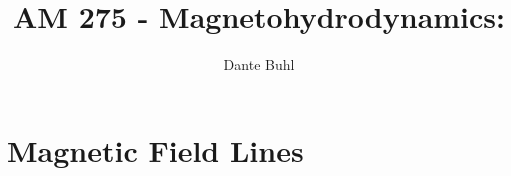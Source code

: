 \documentclass{article}
\begin{document}
\title{AM 275 - Magnetohydrodynamics:}
\author{Dante Buhl}


\newcommand{\wrms}{w_{\text{rms}}}
\newcommand{\bs}[1]{\boldsymbol{#1}}
\newcommand{\tb}[1]{\textbf{#1}}
\newcommand{\bmp}[1]{\begin{minipage}{#1\textwidth}}
\newcommand{\emp}{\end{minipage}}
\newcommand{\R}{\mathbb{R}}
\newcommand{\C}{\mathbb{C}}
\newcommand{\N}{\mathcal{N}}
\newcommand{\K}{\bs{\mathrm{K}}}
\newcommand{\m}{\bs{\mu}_*}
\newcommand{\s}{\bs{\Sigma}_*}
\newcommand{\dt}{\Delta t}
\newcommand{\dx}{\Delta x}
\newcommand{\tr}[1]{\text{Tr}(#1)}
\newcommand{\Tr}[1]{\text{Tr}(#1)}
\newcommand{\Div}{\nabla \cdot}
\renewcommand{\div}{\nabla \cdot}
\newcommand{\Curl}{\nabla \times}
\newcommand{\Grad}{\nabla}
\newcommand{\grad}{\nabla}
\newcommand{\grads}{\nabla_s}
\newcommand{\gradf}{\nabla_f}
\newcommand{\xs}{x_s}
\newcommand{\xf}{x_f}
\newcommand{\ts}{t_s}
\newcommand{\tf}{t_f}
\newcommand{\pt}{\partial t}
\newcommand{\pz}{\partial z}
\newcommand{\uvec}{\bs{u}}
\newcommand{\bvec}{\bs{B}}
\newcommand{\B}{\bs{B}}
\newcommand{\jvec}{\bs{j}}
\newcommand{\F}{\bs{F}}
\newcommand{\T}{\tilde{T}}
\newcommand{\ez}{\bs{e}_z}
\newcommand{\ex}{\bs{e}_x}
\newcommand{\ey}{\bs{e}_y}
\newcommand{\eo}{\bs{e}_{\bs{\Omega}}}
\newcommand{\ppt}[1]{\frac{\partial #1}{\partial t}}
\newcommand{\pp}[2]{\frac{\partial #1}{\partial #2}}
\newcommand{\pptwo}[2]{\frac{\partial^2 #1}{\partial #2^2}}
\newcommand{\DDt}[1]{\frac{D #1}{D t}}
\newcommand{\ppts}[1]{\frac{\partial #1}{\partial t_s}}
\newcommand{\pptf}[1]{\frac{\partial #1}{\partial t_f}}
\newcommand{\ppz}[1]{\frac{\partial #1}{\partial z}}
\newcommand{\ddz}[1]{\frac{d #1}{d z}}
\newcommand{\ppzetas}[1]{\frac{\partial^2 #1}{\partial \zeta^2}}
\newcommand{\ppzs}[1]{\frac{\partial #1}{\partial z_s}}
\newcommand{\ppzf}[1]{\frac{\partial #1}{\partial z_f}}
\newcommand{\ppx}[1]{\frac{\partial #1}{\partial x}}
\newcommand{\ppxi}[1]{\frac{\partial #1}{\partial x_i}}
\newcommand{\ppxj}[1]{\frac{\partial #1}{\partial x_j}}
\newcommand{\ppy}[1]{\frac{\partial #1}{\partial y}}
\newcommand{\ppzeta}[1]{\frac{\partial #1}{\partial \zeta}}


\maketitle 
\setlength{\parindent}{0pt}

\section{Magnetic Field Lines}
\end{document}
